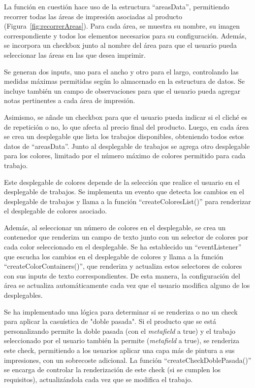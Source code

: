 \documentclass[12pt]{article}
\begin{document}
La función en cuestión hace uso de la estructura ``areasData'', permitiendo recorrer todas las áreas de impresión asociadas al producto (Figura~\ref{fig:recorrerAreas}). 
Para cada área, se muestra su nombre, su imagen correspondiente y todos los elementos necesarios para su configuración. Además, se incorpora
un checkbox junto al nombre del área para que el usuario pueda seleccionar las áreas en las que desea imprimir.

Se generan dos inputs, uno para el ancho y otro para el largo, controlando las medidas máximas permitidas según lo almacenado en la estructura de datos.
Se incluye también un campo de observaciones para que el usuario pueda agregar notas pertinentes a cada área de impresión.

Asimismo, se añade un checkbox para que el usuario pueda indicar si el cliché es de repetición o no, lo que afecta al precio final del producto. Luego, 
en cada área se crea un desplegable que lista los trabajos disponibles, obteniendo todos estos datos de ``areasData''. Junto al desplegable de trabajos se agrega 
otro desplegable para los colores, limitado por el número máximo de colores permitido para cada trabajo.

Este desplegable de colores depende de la selección que realice el usuario en el desplegable de trabajos. Se implementa un evento que detecta los cambios en el 
desplegable de trabajos y llama a la función ``createColoresList()'' para renderizar el desplegable de colores asociado.

Además, al seleccionar un número de colores en el desplegable, se crea un contenedor que renderiza un campo de texto junto con un selector de colores por cada 
color seleccionado en el desplegable. Se ha establecido un ``eventListener'' que escucha los cambios en el desplegable de colores y llama a la función 
``createColorContainers()'', que renderiza y actualiza estos selectores de colores con sus inputs de texto correspondientes. De esta manera, 
la configuración del área se actualiza automáticamente cada vez que el usuario modifica alguno de los desplegables.

Se ha implementado una lógica para determinar si se renderiza o no un check para aplicar la casuística de "doble pasada". Si el producto que se está 
personalizando permite la doble pasada (con el \textit{metafield} a true) y el trabajo seleccionado por el usuario también la permite 
(\textit{metafield} a true), se renderiza este check, permitiendo a los usuarios aplicar una capa más de pintura a sus impresiones, 
con un sobrecoste adicional. La función ``createCheckDoblePasada()'' se encarga de controlar la renderización de este check (si se cumplen los requisitos), 
actualizándola cada vez que se modifica el trabajo.
\end{document}
